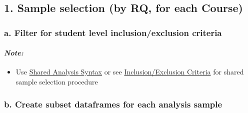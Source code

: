 \documentclass[]{article}
\newenvironment{Shaded}{\begin{snugshade}}{\end{snugshade}}
\newcommand{\KeywordTok}[1]{\textcolor[rgb]{0.13,0.29,0.53}{\textbf{#1}}}
\newcommand{\DecValTok}[1]{\textcolor[rgb]{0.00,0.00,0.81}{#1}}
\newcommand{\StringTok}[1]{\textcolor[rgb]{0.31,0.60,0.02}{#1}}
\newcommand{\CommentTok}[1]{\textcolor[rgb]{0.56,0.35,0.01}{\textit{#1}}}
\newcommand{\OperatorTok}[1]{\textcolor[rgb]{0.81,0.36,0.00}{\textbf{#1}}}
\newcommand{\NormalTok}[1]{#1}
\providecommand{\tightlist}{%
  \setlength{\itemsep}{0pt}\setlength{\parskip}{0pt}}
\let\oldparagraph\paragraph
\renewcommand{\paragraph}[1]{\oldparagraph{#1}\mbox{}}
\begin{document}
\subsection{1. Sample selection (by RQ, for each
Course)}\label{sample-selection-by-rq-for-each-course}

\subsubsection{a. Filter for student level inclusion/exclusion
criteria}\label{a.-filter-for-student-level-inclusionexclusion-criteria}

\paragraph{\texorpdfstring{\emph{Note:}}{Note:}}\label{note-8}

\begin{itemize}
\tightlist
\item
  Use
  \href{https://github.com/seismic2020/WG1-P4/tree/master/Shared\%20Analysis}{Shared
  Analysis Syntax} or see
  \href{https://docs.google.com/spreadsheets/d/1rN8W_iz1mr7lEzBGfdTZHa45wKOSLiSF8VEpChCPsmE/edit\#gid=727713658}{Inclusion/Exclusion
  Criteria} for shared sample selection procedure
\end{itemize}

\begin{Shaded}
\end{Shaded}

\subsubsection{b. Create subset dataframes for each analysis
sample}\label{b.-create-subset-dataframes-for-each-analysis-sample}
\end{document}
